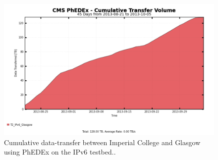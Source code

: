 \begin{figure}[htp]
\centering
\includegraphics{phedex-transfer-volume}
\caption{Cumulative data-transfer between Imperial College and Glasgow using PhEDEx on the IPv6 testbed..}\label{fig:phedex-transfer-volume}
\end{figure}

